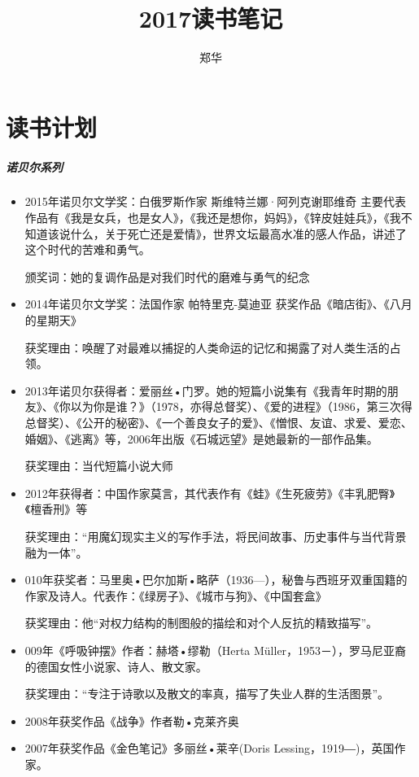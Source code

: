 \documentclass[UTF8,a4paper,8pt]{ctexart}
\author{郑华}
\title{2017读书笔记}
\begin{document}
	\maketitle
	\tableofcontents
	
	\newpage
	\section*{读书计划} 
		\subparagraph{诺贝尔系列}
		\begin{itemize}
			\item 2015年诺贝尔文学奖：白俄罗斯作家   斯维特兰娜·阿列克谢耶维奇 主要代表作品有《我是女兵，也是女人》，《我还是想你，妈妈》，《锌皮娃娃兵》，《我不知道该说什么，关于死亡还是爱情》，世界文坛最高水准的感人作品，讲述了这个时代的苦难和勇气。
			
			颁奖词：她的复调作品是对我们时代的磨难与勇气的纪念
			\item 2014年诺贝尔文学奖：法国作家   帕特里克-莫迪亚 获奖作品《暗店街》、《八月的星期天》
			
			获奖理由：唤醒了对最难以捕捉的人类命运的记忆和揭露了对人类生活的占领。
			\item 2013年诺贝尔获得者：爱丽丝•门罗。她的短篇小说集有《我青年时期的朋友》、《你以为你是谁？》（1978，亦得总督奖）、《爱的进程》（1986，第三次得总督奖）、《公开的秘密》、《一个善良女子的爱》、《憎恨、友谊、求爱、爱恋、婚姻》、《逃离》等，2006年出版《石城远望》是她最新的一部作品集。
			
			获奖理由：当代短篇小说大师
			\item 2012年获得者：中国作家莫言，其代表作有《蛙》《生死疲劳》《丰乳肥臀》《檀香刑》等
			
			获奖理由：“用魔幻现实主义的写作手法，将民间故事、历史事件与当代背景融为一体”。
			\item 010年获奖者：马里奥•巴尔加斯•略萨（1936—），秘鲁与西班牙双重国籍的作家及诗人。代表作：《绿房子》、《城市与狗》、《中国套盒》
			
			获奖理由：他“对权力结构的制图般的描绘和对个人反抗的精致描写”。
			\item 009年《呼吸钟摆》作者：赫塔•缪勒（Herta Müller，1953－），罗马尼亚裔的德国女性小说家、诗人、散文家。
			
			获奖理由：“专注于诗歌以及散文的率真，描写了失业人群的生活图景”。
			\item 2008年获奖作品《战争》作者勒•克莱齐奥
			\item 2007年获奖作品《金色笔记》多丽丝•莱辛(Doris Lessing，1919―)，英国作家。
			

\end{itemize}
\end{document}
